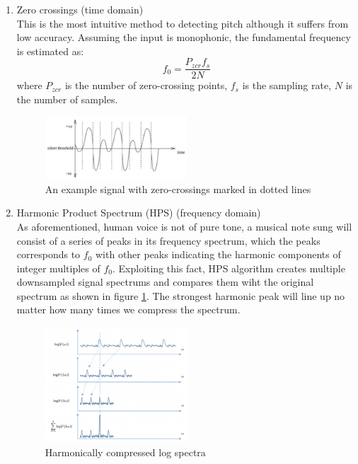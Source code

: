 \begin{enumerate}
	\item Zero crossings (time domain)\\
	This is the most intuitive method to detecting pitch although it suffers from low accuracy.
	Assuming the input is monophonic, the fundamental frequency is estimated as:
	\[f_0 = \frac{P_{zcr}f_s}{2N}\]
	where $P_{zcr}$ is the number of zero-crossing points, $f_s$ is the sampling rate,
	$N$ is the number of samples.
	\begin{figure}[h]
		\centering
		\includegraphics[width=0.5\textwidth]{Figures/zcr.png}
		\caption{An example signal with zero-crossings marked in dotted lines }
	\end{figure}

	\item Harmonic Product Spectrum (HPS) (frequency domain)\\
	As aforementioned, human voice is not of pure tone, a musical note sung will consist of a series of peaks in its frequency spectrum,
	which the peaks corresponds to $f_0$ with other peaks indicating the harmonic components of integer multiples of $f_0$. 
	Exploiting this fact, HPS algorithm creates multiple downsampled signal spectrums and compares them wiht the original spectrum as shown in figure 
	\ref{HPS}. The strongest harmonic peak will line up no matter how many times we compress the spectrum.
	
	\begin{figure}[h]
		\centering
		\includegraphics[width=0.5\textwidth]{Figures/HPS.png}
		\caption{Harmonically compressed log spectra }
		\label{HPS}
	\end{figure}
	

\end{enumerate}
